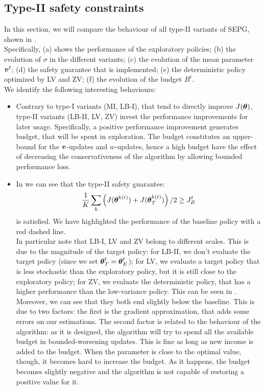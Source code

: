 \subsection{Type-II safety constraints}
In this section, we will compare the behaviour of all type-II variants of SEPG, shown in . \\
Specifically, (a) shows the performance of the exploratory policies; (b) the evolution of $\sigma$ in the different variants; (c) the evolution of the mean parameter $\vv^t$; (d) the safety guarantee that is implemented; (e) the deterministic policy optimized by LV and ZV; (f) the evolution of the budget $B^t$. \\
We identify the following interesting behaviours:
\begin{itemize}
\item Contrary to type-I variants (MI, LB-I), that  tend to directly improve $J(\vtheta)$, type-II variants (LB-II, LV, ZV) invest the  performance improvements for later usage. Specifically, a positive performance improvement generates budget, that will be spent in exploration. The budget constitutes an upper-bound for the $\vv$-updates and $w$-updates, hence a high budget have the effect of decreasing the conservativeness of the algorithm by allowing bounded performance loss.

\item In  we can see that the type-II safety guarantee:
\[
\frac{1}{K}\sum_k \left(J(\vtheta^{k(t)}) + J(\vtarget[k(t)])\right)/2 \geq \jbase
\]
is satisfied. We have highlighted the performance of the baseline policy with a red dashed line. \\
In particular note that LB-I, LV and ZV belong to different scales. This is due to the magnitude of the target policy: for LB-II, we don't evaluate the target policy (since we set $\vtheta^t_T = \vtheta^t_E$); for LV, we evaluate a target policy that is less stochastic than the exploratory policy, but it is still close to the exploratory policy; for ZV, we evaluate the deterministic policy, that has a higher performance than the low-variance policy. This can be seen in . \\
Moreover, we can see that they both end slightly below the baseline. This is due to two factors: the first is the gradient approximation, that adds some errors on our estimations. The second factor is related to the behaviour of the algorithm: as it is designed, the algorithm will try to spend all the available budget in bounded-worsening updates. This is fine as long as new income is added to the budget. When the parameter is close to the optimal value, though, it becomes hard to increase the budget. As it happens, the budget becomes slightly negative and the algorithm is not capable of restoring a positive value for it. 


\end{itemize}
